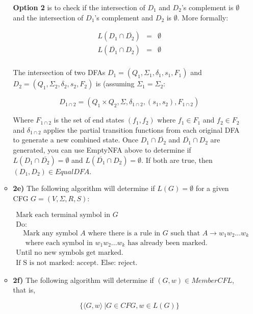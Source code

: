 \documentclass[12pt]{article}
\begin{document}
\begin{enumerate}
\begin{itemize}
\textbf{Option 2} is to check if the intersection of $D_1$ and $D_2$'s complement is $\emptyset$ and the intersection of $D_1$'s complement and $D_2$ is $\emptyset$. More formally:

\[
\begin{array}{lcr}
L(D_1 \cap \overline{D_2}) & = & \emptyset \\
L(\overline{D_1} \cap D_2) & = & \emptyset \\
\end{array} 
\]

The intersection of two DFAs $D_1 = (Q_1, \Sigma_1, \delta_1, s_1, F_1)$ and $D_2 = (Q_1, \Sigma_2, \delta_2, s_2, F_2)$ is (assuming $\Sigma_1 = \Sigma_2: $

\begin{equation*}
D_{1\cap 2} = (Q_1 \times Q_2, \Sigma, \delta_{1\cap 2}, (s_1,s_2), F_{1\cap 2})
\end{equation*}

Where $F_{1\cap 2}$ is the set of end states $(f_1,f_2)$ where $f_1 \in F_1$ and $f_2 \in F_2$ and $\delta_{1\cap2}$ applies the partial transition functions from each original DFA to generate a new combined state. Once $D_1 \cap \overline{D_2}$ and $\overline{D_1} \cap D_2$ are generated, you can use EmptyNFA above to determine if $L(D_1 \cap \overline{D_2}) = \emptyset$ and $L(\overline{D_1} \cap D_2) = \emptyset$. If both are true, then $(D_1,D_2) \in EqualDFA$.

\item \textbf{2e)} The following algorithm will determine if $L(G) = \emptyset$ for a given CFG $G = (V,\Sigma, R, S)$:

\[
\begin{array}{l}
\textrm{Mark each terminal symbol in }G \\
\textrm{Do:} \\
\quad \textrm{Mark any symbol $A$ where there is a rule in $G$ such that }A \rightarrow w_1w_2...w_k \\
\quad \textrm{ where each symbol in $w_1w_2...w_k$ has already been marked.} \\
\textrm{Until no new symbols get marked.} \\
\textrm{If S is not marked: accept. Else: reject.}
\end{array}
\]

\item \textbf{2f)} The following algorithm will determine if $(G,w) \in MemberCFL$, that is,

\begin{equation}
\{\langle G,w\rangle\ | G \in CFG, w \in L(G)\}
\end{equation}


\end{itemize}
\end{enumerate}
\end{document}
